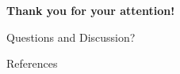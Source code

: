 \documentclass[aspectratio=169]{beamer}
\begin{document}
\begin{frame}
  \begin{center}
    \large\textbf{Thank you for your attention!}

    \vspace{0.5cm}

    \normalsize
    Questions and Discussion?
  \end{center}
\end{frame}

\begin{frame}[allowframebreaks]{References}
  \printbibliography
\end{frame}
\end{document}
